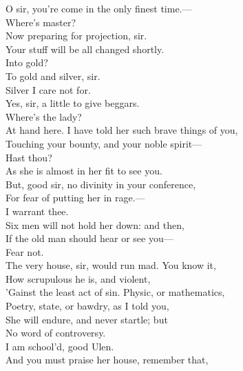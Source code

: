 \documentclass[a4paper,oneside]{memoir}
\begin{document}
\begin{drama*}
\facespeaks O sir, you're come in the only finest time.---\\
\mammonspeaks Where's master?\\
\facespeaks {} Now preparing for projection, sir.\\
Your stuff will be all changed shortly.\\
\mammonspeaks {} Into gold?\\
\facespeaks To gold and silver, sir.\\
\mammonspeaks {} Silver I care not for.\\
\facespeaks Yes, sir, a little to give beggars.\\
\mammonspeaks {} Where's the lady?\\
\facespeaks At hand here. I have told her such brave things of you,\\
Touching your bounty, and your noble spirit---\\
\mammonspeaks Hast thou?\\
\facespeaks {} As she is almost in her fit to see you.\\
But, good sir, no divinity in your conference,\\
For fear of putting her in rage.---\\
\mammonspeaks {} I warrant thee.\\
\facespeaks Six men  will not hold her down: and then,\\
If the old man should hear or see you---\\
\mammonspeaks {} Fear not.\\
\facespeaks The very house, sir, would run mad. You know it,\\
How scrupulous he is, and violent,\\
'Gainst the least act of sin. Physic, or mathematics,\\
Poetry, state, or bawdry, as I told you,\\
She will endure, and never startle; but\\
No word of controversy.\\
\mammonspeaks {} I am school'd, good Ulen.\\
\facespeaks And you must praise her house, remember that,\\

\end{drama*}
\end{document}

